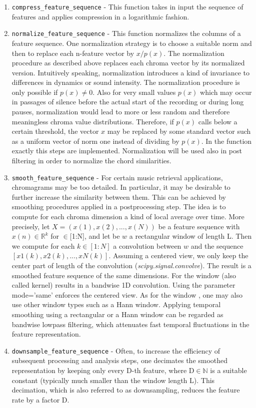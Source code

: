 \documentclass[
	12pt, %
]{fphw}
\begin{document}
\begin{enumerate}
	\item \verb|compress_feature_sequence| - This function takes in input the sequence of features and applies compression in a logarithmic fashion.
	\item \verb|normalize_feature_sequence| - This function normalizes the columns of a feature sequence. One normalization strategy is to choose a suitable norm  and then to replace each n-feature vector  by $x/p(x)$. The normalization procedure as described above replaces each chroma vector by its normalized version. Intuitively speaking, normalization introduces a kind of invariance to differences in dynamics or sound intensity. The normalization procedure is only possible if $p(x) \neq 0$. Also for very small values $p(x)$ which may occur in passages of silence before the actual start of the recording or during long pauses, normalization would lead to more or less random and therefore meaningless chroma value distributions. Therefore, if $p(x)$ calls below a certain threshold, the vector $x$ may be replaced by some standard vector such as a uniform vector of norm one instead of dividing by $p(x)$. In the function exactly this steps are implemented. Normalization will be used also in post filtering in order to normalize the chord similarities.
	\item \verb|smooth_feature_sequence| - For certain music retrieval applications, chromagrams may be too detailed. In particular, it may be desirable to further increase the similarity between them. This can be achieved by smoothing procedures applied in a postprocessing step. The idea is to compute for each chroma dimension a kind of local average over time. More precisely, let $X=(x(1),x(2),...,x(N))$ be a feature sequence with $x(n)\in \mathbb{R}^k$ for $\in$[1:N], and let be $w$ a rectangular window  of length L. Then we compute for each $k \in[1:N]$ a convolution between $w$ and the sequence $[x1(k),x2(k),...,xN(k)]$. Assuming a centered view, we only keep the center part of length of the convolution (\textit{scipy.signal.convolve}). The result is a smoothed feature sequence of the same dimensions. For the window (also called kernel) results in a bandwise 1D convolution. Using the parameter mode='same' enforces the centered view. As for the window , one may also use other window types such as a Hann window. Applying temporal smoothing using a rectangular or a Hann window can be regarded as bandwise lowpass filtering, which attenuates fast temporal fluctuations in the feature representation.
	\item \verb|downsample_feature_sequence| - Often, to increase the efficiency of subsequent processing and analysis steps, one decimates the smoothed representation by keeping only every D-th feature, where D$\in\mathbb{N}$ is a suitable constant (typically much smaller than the window length L). This decimation, which is also referred to as downsampling, reduces the feature rate by a factor D.
\end{enumerate}
\end{document}
